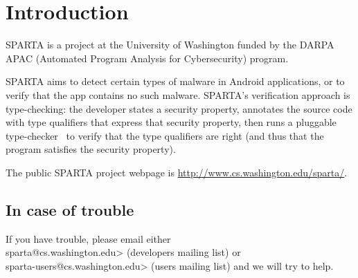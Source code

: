 \htmlhr
\chapter{Introduction\label{introduction}}

SPARTA is a project at the University of Washington funded by the DARPA
APAC (Automated Program Analysis for Cybersecurity) program.


SPARTA aims to detect certain types of malware in Android applications, or
to verify that the app contains no such malware.  SPARTA's verification
approach is type-checking:  the developer states a security property,
annotates the source code with type qualifiers that express that security
property, then runs a pluggable type-checker~\cite{PapiACPE2008,DietlDEMS2011} to verify that the type
qualifiers are right (and thus that the program satisfies the security
property).

The public SPARTA project webpage is
\url{http://www.cs.washington.edu/sparta/}.


\section{In case of trouble}

If you have trouble, please email either\\
\<sparta@cs.washington.edu>
(developers mailing list) or\\
\<sparta-users@cs.washington.edu> (users
mailing list) and we will try to help.





